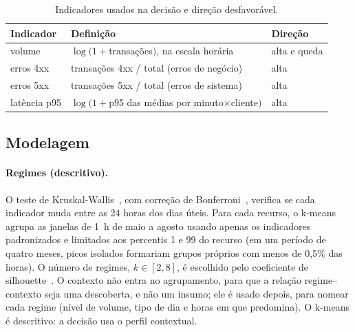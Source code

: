 \documentclass[sigconf,nonacm]{acmart}
\begin{document}
\begin{table}[t]
  \caption{Indicadores usados na decisão e direção desfavorável.}
  \label{tab:atributos}
  \small
  \begin{tabular}{p{}p{}p{}}
    \toprule
    Indicador & Definição & Direção \\
    \midrule
    volume & $\log(1+$transações$)$, na escala horária & alta e queda \\
    erros 4xx & transações 4xx / total (erros de negócio) & alta \\
    erros 5xx & transações 5xx / total (erros de sistema) & alta \\
    latência p95 & $\log(1+$p95 das médias por minuto$\times$cliente$)$ & alta \\
    \bottomrule
  \end{tabular}
\end{table}

\subsection{Modelagem}

\paragraph{Regimes (descritivo).} O teste de Kruskal-Wallis~\citep{kruskal1952ranks}, com correção de Bonferroni~\citep{dunn1961multiple}, verifica se cada indicador muda entre as 24 horas dos dias úteis. Para cada recurso, o k-means~\citep{lloyd1982kmeans} agrupa as janelas de 1~h de maio a agosto usando apenas os indicadores padronizados e limitados aos percentis 1 e 99 do recurso (em um período de quatro meses, picos isolados formariam grupos próprios com menos de 0,5\% das horas). O número de regimes, $k\in[2,8]$, é escolhido pelo coeficiente de silhouette~\citep{rousseeuw1987silhouette}. O contexto não entra no agrupamento, para que a relação regime--contexto seja uma descoberta, e não um insumo; ele é usado depois, para nomear cada regime (nível de volume, tipo de dia e horas em que predomina). O k-means é descritivo: a decisão usa o perfil contextual.
\end{document}
